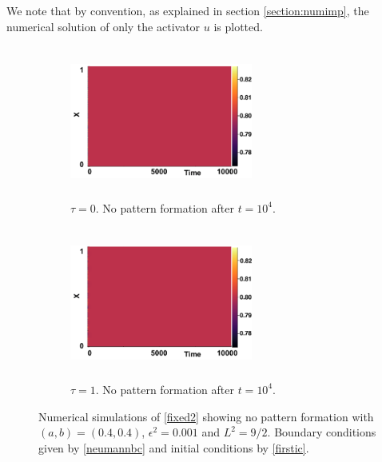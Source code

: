 We note that by convention, as explained in section \ref{section:numimp}, the numerical solution of only the activator $u$ is plotted.
\begin{figure}[H]
    \centering
    \begin{subfigure}[t]{0.45\textwidth}
        \centering
        \includegraphics[width=6cm,height = 5cm]{nopatt1.png}
        \caption{$\tau=0$. No pattern formation after $t=10^4$. }
        \label{}
    \end{subfigure}
    \hfill
    \begin{subfigure}[t]{0.45\textwidth}
        \centering
        \includegraphics[width=6cm,height = 5cm]{nopatt2.png}
        \caption{$\tau=1.$ No pattern formation after $t=10^4$.}
        \label{}
    \end{subfigure}
    \caption{Numerical simulations of \eqref{fixed2} showing no pattern formation with $(a,b)=(0.4,0.4)$, $\epsilon^2=0.001$ and $L^2=9/2$. Boundary conditions given by \eqref{neumannbc} and initial conditions by \eqref{firstic}.}
    \label{fig:fixedsim1}
\end{figure}
